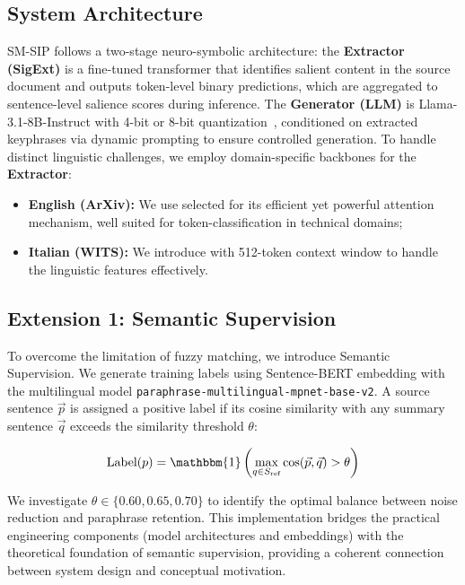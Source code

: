 \documentclass[conference]{IEEEtran}
\begin{document}
\subsection{System Architecture}

SM-SIP follows a two-stage neuro-symbolic architecture: the \textbf{Extractor (SigExt)} is a fine-tuned transformer that identifies salient content in the source document and outputs token-level binary predictions, which are aggregated to sentence-level salience scores during inference. The \textbf{Generator (LLM)} is Llama-3.1-8B-Instruct with 4-bit or 8-bit quantization~\cite{dettmers2022llm}, conditioned on extracted keyphrases via dynamic prompting to ensure controlled generation. To handle distinct linguistic challenges, we employ domain-specific backbones for the \textbf{Extractor}: 
\begin{itemize}
    \item  \textbf{English (ArXiv):} We use  selected for its efficient yet powerful attention mechanism, well suited for token-classification in technical domains;
    \item  \textbf{Italian (WITS):} We introduce  with 512-token context window to handle the linguistic features effectively.
\end{itemize}

\subsection{Extension 1: Semantic Supervision}
\label{sec:semantic}

To overcome the limitation of fuzzy matching, we introduce Semantic Supervision. We generate training labels using Sentence-BERT embedding with the multilingual model \texttt{paraphrase-multilingual-mpnet-base-v2}. A source sentence  $\vec{p}$ is assigned a positive label if its cosine similarity with any summary sentence $\vec{q}$ exceeds the similarity threshold $\theta$:

$$\text{Label}(p) = \mathbbm{1}\left( \max_{q \in S_{\text{ref}}} \cos(\vec{p}, \vec{q}) > \theta \right)$$

We investigate $\theta \in \{0.60, 0.65, 0.70\}$ to identify the optimal balance between noise reduction and paraphrase retention. This implementation bridges the practical engineering components (model architectures and embeddings) with the theoretical foundation of semantic supervision, providing a coherent connection between system design and conceptual motivation.
\end{document}
